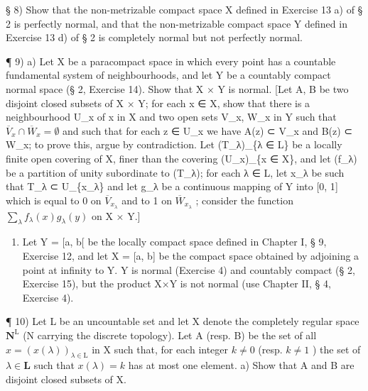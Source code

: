 § 8) Show that the non-metrizable compact space X defined in Exercise 13 a) of § 2 is perfectly normal, and that the non-metrizable compact space Y defined in Exercise 13 d) of § 2 is completely normal but not perfectly normal.

¶ 9) a) Let X be a paracompact space in which every point has a countable fundamental system of neighbourhoods, and let Y be a countably compact normal space (§ 2, Exercise 14). Show that X × Y is normal. {[}Let A, B be two disjoint closed subsets of X × Y; for each x ∈ X, show that there is a neighbourhood U\_x of x in X and two open sets V\_x, W\_x in Y such that \(\overline{V}_x \cap \overline{W}_x = \emptyset\) and such that for each z ∈ U\_x we have A(z) ⊂ V\_x and B(z) ⊂ W\_x; to prove this, argue by contradiction. Let (T\_λ)\_\{λ ∈ L\} be a locally finite open covering of X, finer than the covering (U\_x)\_\{x ∈ X\}, and let (f\_λ) be a partition of unity subordinate to (T\_λ); for each λ ∈ L, let x\_λ be such that T\_λ ⊂ U\_\{x\_λ\} and let g\_λ be a continuous mapping of Y into {[}0, 1{]} which is equal to 0 on \(\overline{V}_{x_λ}\) and to 1 on \(\overline{W}_{x_λ}\) ; consider the function \(\sum_{\lambda} f_\lambda(x) g_\lambda(y)\) on X × Y.{]}

\begin{enumerate}
\def\labelenumi{\alph{enumi})}
\setcounter{enumi}{1}
\tightlist
\item
  Let Y = {[}a, b{[} be the locally compact space defined in Chapter I, § 9, Exercise 12, and let X = {[}a, b{]} be the compact space obtained by adjoining a point at infinity to Y. Y is normal (Exercise 4) and countably compact (§ 2, Exercise 15), but the product X×Y is not normal (use Chapter II, § 4, Exercise 4).
\end{enumerate}

¶ 10) Let L be an uncountable set and let X denote the completely regular space \(\mathbf{N}^{\mathrm{L}}\) (N carrying the discrete topology). Let A (resp. B) be the set of all \(x = (x(\lambda))_{\lambda \in \mathrm{L}}\) in X such that, for each integer \(k \neq 0\) (resp. \(k \neq 1\) ) the set of \(\lambda \in \mathbf{L}\) such that \(x(\lambda) = k\) has at most one element. a) Show that A and B are disjoint closed subsets of X.

